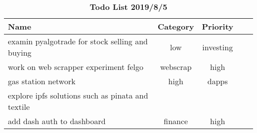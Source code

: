 \begin{table}
\begin{tabular}{p{3cm} c c c c}Name & Category & Priority \\ \hline  examin pyalgotrade for stock selling and buying &  low &  investing \\ \hline  work on web scrapper experiment felgo &  webscrap &  high \\ \hline  gas station network  &  high &  dapps \\ \hline  explore ipfs solutions such as pinata and textile &   &  \\ \hline  add dash auth to dashboard &  finance &  high \\ \hline
\end{tabular}
\caption{\textbf{Todo List 2019/8/5}}
\end{table}